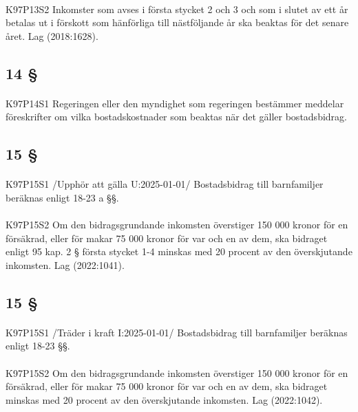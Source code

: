 \documentclass[a4paper,notitlepage,openany,10pt]{book}
\begin{document}
\paragraph*{}
{\tiny K97P13S2}
Inkomster som avses i första stycket 2 och 3 och som i slutet av ett år betalas ut i förskott som hänförliga till nästföljande år ska beaktas för det senare året.
Lag (2018:1628).
\subsection*{14 §}
\paragraph*{}
{\tiny K97P14S1}
Regeringen eller den myndighet som regeringen bestämmer meddelar föreskrifter om vilka bostadskostnader som beaktas när det gäller bostadsbidrag.
\subsection*{15 §}
\paragraph*{}
{\tiny K97P15S1}
/Upphör att gälla U:2025-01-01/
Bostadsbidrag till barnfamiljer beräknas enligt 18-23 a §§.
\paragraph*{}
{\tiny K97P15S2}
Om den bidragsgrundande inkomsten överstiger 150 000 kronor för en försäkrad, eller för makar 75 000 kronor för var och en av dem, ska bidraget enligt 95 kap. 2 § första stycket 1-4 minskas med 20 procent av den överskjutande inkomsten.
Lag (2022:1041).
\subsection*{15 §}
\paragraph*{}
{\tiny K97P15S1}
/Träder i kraft I:2025-01-01/
Bostadsbidrag till barnfamiljer beräknas enligt 18-23 §§.
\paragraph*{}
{\tiny K97P15S2}
Om den bidragsgrundande inkomsten överstiger 150 000 kronor för en försäkrad, eller för makar 75 000 kronor för var och en av dem, ska bidraget minskas med 20 procent av den överskjutande inkomsten.
Lag (2022:1042).
\end{document}

